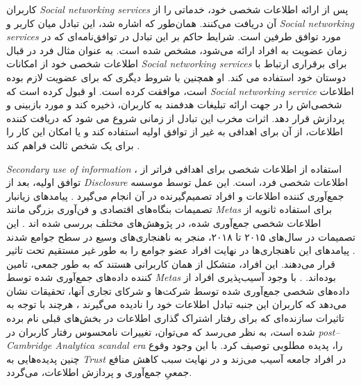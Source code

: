 کاربران
\textit{
  \glspl{Social networking service}
}
پس از ارائه اطلاعات شخصی خود، خدماتی را از آن دریافت می‌کنند. همان‌طور که اشاره شد، این
تبادل میان کاربر و
\textit{
  \glspl{Social networking service}
}
مورد توافق طرفین است. شرایط حاکم بر این تبادل در توافق‌نامه‌ای
که در زمان عضویت به افراد ارائه می‌شود، مشخص شده است. به عنوان مثال
فرد در قبال اطلاعات شخصی خود از امکانات
\textit{
  \glspl{Social networking service}
}
برای برقراری ارتباط با دوستان خود استفاده می کند. او همچنین
با شروط دیگری که  برای عضویت لازم بوده است، موافقت کرده است. او
قبول کرده است که
\textit{
  \gls{Social networking service}
}
اطلاعات شخصی‌اش را در جهت ارائه تبلیغات هدفمند به کاربران، ذخیره کند
و مورد بازبینی و پردازش قرار دهد. اثرات مخرب این تبادل از زمانی شروع می شود که دریافت کننده اطلاعات، از
آن برای اهدافی به غیر از توافق اولیه استفاده کند و یا امکان این کار را برای یک شخص ثالث فراهم کند
.

\textit{
  \gls{Secondary use of information}
}،
استفاده از اطلاعات شخصی برای اهدافی فراتر
از توافق اولیه، بعد از
\textit{
  \gls{Disclosure}
}
اطلاعات شخصی فرد، است. این عمل توسط موسسه جمع‌آوری کننده اطلاعات
و افراد تصمیم‌گیرنده در آن انجام می‌گیرد
.
پیامد‌های زیانبار تصمیمات بنگاه‌های اقتصادی و فن‌آوری بزرگی
مانند
\textit{
  \glspl{Meta}
}
برای استفاده ثانویه از اطلاعات شخصی جمع‌آوری شده، در پژوهش‌های مختلف بررسی شده اند
.
این تصمیمات در سال‌های ۲۰۱۵ تا ۲۰۱۸، منجر به ناهنجاری‌های وسیع در سطح جوامع شدند
.
پیامدهای این ناهنجاری‌ها در نهایت افراد عضو جوامع را به طور غیر مستقیم
تحت تاثیر قرار می‌دهند. این افراد، متشکل از همان کاربرانی هستند که به طور جمعی، تامین کننده
داده‌های جمع‌آوری شده توسط
\textit{
  \glspl{Meta}
}
بوده‌اند.
.
با وجود آسیب‌پذیری افراد از داده‌های شخصی جمع‌آوری شده توسط شرکت‌ها
و شرکای تجاری آنها، تحقیقات نشان می‌دهد
که کاربران این جنبه تبادل اطلاعات خود را نادیده می‌گیرند
،
هرچند با توجه به تاثیرات سازنده‌ای که برای رفتار اشتراک گذاری اطلاعات در بخش‌های
قبلی نام برده شده است، به نظر می‌رسد که می‌توان، تغییرات نامحسوس رفتار کاربران در
\textit{
  \gls{post–Cambridge Analytica scandal era}
}
را، پدیده مطلوبی توصیف کرد. با این وجود وقوع چنین پدیده‌هایی به 
\textit{
  \gls{Trust}
}
 در افراد جامعه آسیب می‌زند و در نهایت سبب کاهش منافع جمعیِ جمع‌آوری و پردازش اطلاعات، می‌گردد.


